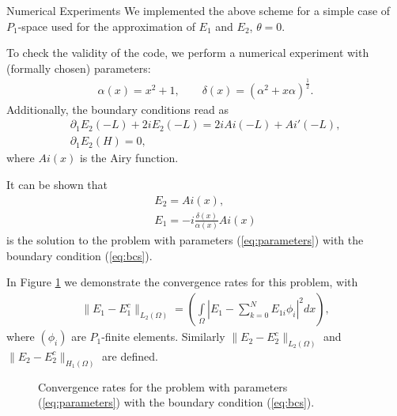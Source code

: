 \documentclass[11pt]{amsart}
\begin{document}
\begin{subsection}{Numerical Experiments}
We implemented the above scheme for a simple case of $P_{1}$-space used for the approximation of $E_{1}$ and $E_{2}$, $\theta=0$. 

To check the validity of the code, we perform a numerical experiment with (formally chosen) parameters:
\begin{align}
\label{eq:parameters}
\alpha(x)=x^2+1,\qquad \delta(x)=\left(\alpha^2+x\alpha\right)^{\frac{1}{2}}.
\end{align}
Additionally, the boundary conditions read as 
\begin{align}
\label{eq:bcs}
\partial_{1}E_{2}(-L)+2iE_{2}(-L)=2iAi(-L)+Ai'(-L),\\
\partial_{1}E_{2}(H)=0,
\end{align}
where $Ai(x)$ is the Airy function.

It can be shown that 
\begin{align*}
E_{2}=Ai(x),\\
E_{1}=-i\frac{\delta(x)}{\alpha(x)}Ai(x)
\end{align*}
is the solution to the problem with parameters (\ref{eq:parameters}) with the boundary condition (\ref{eq:bcs}).

In Figure \ref{fig:conv_rate} we demonstrate the convergence rates for this problem, with 
\begin{align*}
\|E_{1}-E_{1}^{c}\|_{L_{2}(\Omega)}=\left(\int\limits_{\Omega}\left|E_{1}-\sum\limits_{k=0}^{N}E_{1i}\phi_{i}\right|^2dx\right),
\end{align*}
where $\left(\phi_{i}\right)$ are $P_{1}$-finite elements. Similarly $\|E_{2}-E_{2}^{c}\|_{L_{2}(\Omega)}$ and $\|E_{2}-E_{2}^{c}\|_{H_{1}(\Omega)}$ are defined. 

\begin{figure}
    \caption{Convergence rates for the problem with parameters (\ref{eq:parameters}) with the boundary condition (\ref{eq:bcs}).}
    \label{fig:conv_rate}
\end{figure}


\end{subsection}
\end{document}
